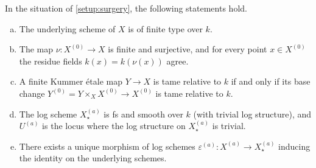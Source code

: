 \begin{lem} \label{lem:surgery-properties}
    In the situation of \cref{setup:surgery}, the following statements hold. 
    \begin{enumerate}[(a)]
        \item \label{lemitem:surgery-finite-type}
        The underlying scheme of $X$ is of finite type over $k$.
        
        \item \label{lemitem:surgery-finite-normalisation}
        The map $\nu\colon X^{(0)}\to X$ is finite and surjective, and for every point $x \in X^{(0)}$ the residue fields $k(x) = k(\nu(x))$ agree. 
        
        \item \label{lemitem:surgery-tameness}
        A finite Kummer \'etale map $Y\to X$ is tame relative to $k$ if and only if its base change $Y^{(0)} = Y\times_X X^{(0)}\to X^{(0)}$ is tame relative to $k$. 
                
        \item \label{lemitem:surgery-fs-and-smooth}
        The log scheme $X^{(a)}_\star$ is fs and smooth over $k$ (with trivial log structure), and $U^{(a)}$ is the locus where the log structure on $X^{(a)}_\star$ is trivial.

        \item \label{lemitem:surgery-relative-strip-off-log}
        There exists a unique morphism of log schemes $\varepsilon^{(a)}\colon X^{(a)} \to X^{(a)}_\star$ inducing the identity on the underlying schemes. 
    \end{enumerate}
\end{lem}

